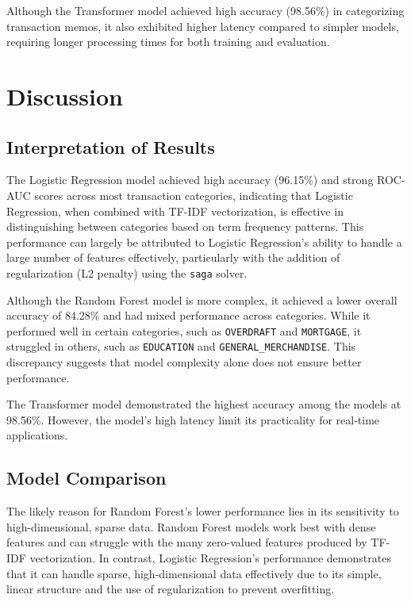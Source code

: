 \documentclass[12pt,letterpaper]{article}
\begin{document}
Although the Transformer model achieved high accuracy (98.56\%) in categorizing transaction memos, it also exhibited higher latency compared to simpler models, requiring longer processing times for both training and evaluation.

\section{Discussion}
\subsection{Interpretation of Results}

The Logistic Regression model achieved high accuracy (96.15\%) and strong ROC-AUC scores across most transaction categories, indicating that Logistic Regression, when combined with TF-IDF vectorization, is effective in distinguishing between categories based on term frequency patterns. This performance can largely be attributed to Logistic Regression's ability to handle a large number of features effectively, particularly with the addition of regularization (L2 penalty) using the \texttt{saga} solver.

Although the Random Forest model is more complex, it achieved a lower overall accuracy of 84.28\% and had mixed performance across categories. While it performed well in certain categories, such as \texttt{OVERDRAFT} and \texttt{MORTGAGE}, it struggled in others, such as \texttt{EDUCATION} and \texttt{GENERAL\_MERCHANDISE}. This discrepancy suggests that model complexity alone does not ensure better performance.

The Transformer model demonstrated the highest accuracy among the models at 98.56\%. However, the model’s high latency limit its practicality for real-time applications. 

\subsection{Model Comparison}
The likely reason for Random Forest’s lower performance lies in its sensitivity to high-dimensional, sparse data. Random Forest models work best with dense features and can struggle with the many zero-valued features produced by TF-IDF vectorization. In contrast, Logistic Regression’s performance demonstrates that it can handle sparse, high-dimensional data effectively due to its simple, linear structure and the use of regularization to prevent overfitting.
\end{document}
